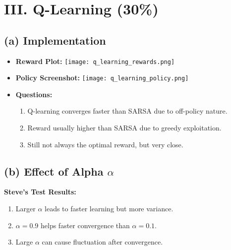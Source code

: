\documentclass{article}
\begin{document}
\newpage
\section*{III. Q-Learning (30\%)}

\subsection*{(a) Implementation}
\begin{itemize}
    \item \textbf{Reward Plot:}
    \texttt{[image: q\_learning\_rewards.png]}

    \item \textbf{Policy Screenshot:}
    \texttt{[image: q\_learning\_policy.png]}

    \item \textbf{Questions:}
    \begin{enumerate}
        \item Q-learning converges faster than SARSA due to off-policy nature.
        \item Reward usually higher than SARSA due to greedy exploitation.
        \item Still not always the optimal reward, but very close.
    \end{enumerate}
\end{itemize}

\subsection*{(b) Effect of Alpha $\alpha$}

\textbf{Steve’s Test Results:}
\begin{enumerate}
    \item Larger $\alpha$ leads to faster learning but more variance.
    \item $\alpha=0.9$ helps faster convergence than $\alpha=0.1$.
    \item Large $\alpha$ can cause fluctuation after convergence.
\end{enumerate}
\end{document}
